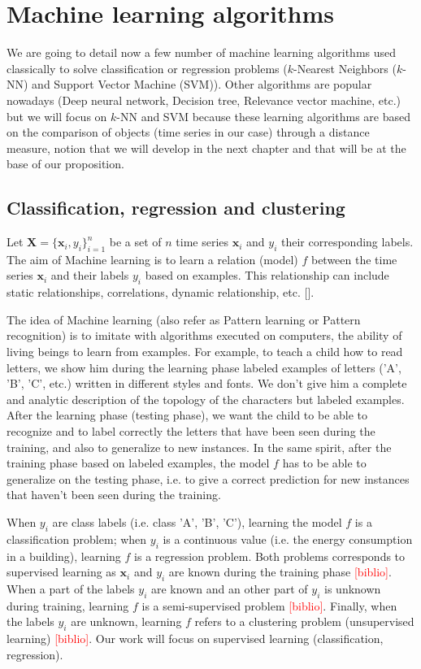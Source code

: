 \section{Machine learning algorithms}

We are going to detail now a few number of machine learning algorithms used classically to solve classification or regression problems ($k$-Nearest Neighbors ($k$-NN) and Support Vector Machine (SVM)). Other algorithms are popular nowadays (Deep neural network, Decision tree, Relevance vector machine, etc.) but we will focus on $k$-NN and SVM because these learning algorithms are based on the comparison of objects (time series in our case) through a distance measure, notion that we will develop in the next chapter and that will be at the base of our proposition.

\subsection{Classification, regression and clustering}
Let $\textbf{X}=\{\textbf{x}_i,y_i\}_{i=1}^n$ be a set of $n$ time series $\textbf{x}_i$ and $y_i$ their corresponding labels. The aim of Machine learning is to learn a relation (model) $f$ between the time series $\textbf{x}_i$ and their labels $y_i$ based on examples. This relationship can include static relationships, correlations, dynamic relationship, etc. [\cite{Dreyfus2006}]. 

The idea of Machine learning (also refer as Pattern learning or Pattern recognition) is to imitate with algorithms executed on computers, the ability of living beings to learn from examples. For example, to teach a child how to read letters, we show him during the learning phase labeled examples of letters ('A', 'B', 'C', etc.) written in different styles and fonts. We don't give him a complete and analytic description of the topology of the characters but labeled examples. After the learning phase (testing phase), we want the child to be able to recognize and to label correctly the letters that have been seen during the training, and also to generalize to new instances. In the same spirit, after the training phase based on labeled examples, the model $f$ has to be able to generalize on the testing phase, i.e. to give a correct prediction for new instances that haven't been seen during the training.

When $y_i$ are class labels (i.e. class 'A', 'B', 'C'), learning the model $f$ is a classification problem; when $y_i$ is a continuous value (i.e. the energy consumption in a building), learning $f$ is a regression problem. Both problems corresponds to supervised learning as $\textbf{x}_i$ and $y_i$ are known during the training phase \textcolor{red}{[biblio]}. When a part of the labels $y_i$ are known and an other part of $y_i$ is unknown during training, learning $f$ is a semi-supervised problem \textcolor{red}{[biblio]}. Finally, when the labels $y_i$ are unknown, learning $f$ refers to a clustering problem (unsupervised learning) \textcolor{red}{[biblio]}. Our work will focus on supervised learning (classification, regression).


